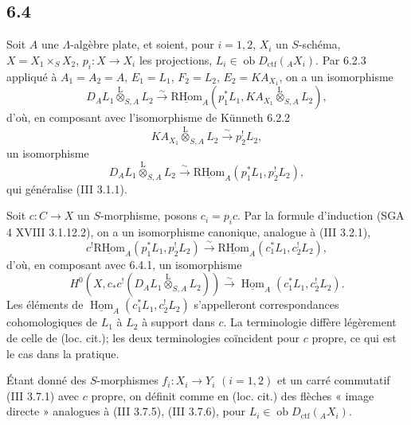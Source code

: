 \documentclass[11pt]{article}
\DeclareMathOperator{\Hom}{Hom}
\providecommand{\RHom}{\mathrm{RHom}}
\providecommand{\uRHom}{\underline{\RHom}}
\providecommand{\uHom}{\underline{\Hom}}
\providecommand{\lten}{\overset{\mathrm L}{\otimes}}
\providecommand{\Ob}{\operatorname{ob}}
\providecommand{\RHom}{\mathrm{RHom}}
\providecommand{\Hom}{\operatorname{Hom}}
\providecommand{\lten}{\overset{\mathrm L}{\otimes}}
\providecommand{\RHom}{\mathrm R\mathcal{H}om}
\providecommand{\lten}{\overset{\mathrm L}{\otimes}}
\providecommand{\Ob}{\operatorname{ob}}
\providecommand{\lten}{\overset{\mathrm L}{\otimes}}
\providecommand{\lten}{\overset{\mathrm L}{\otimes}}
\providecommand{\Ob}{\operatorname{Ob}}
\providecommand{\lten}{\overset{\mathrm L}{\otimes}}
\providecommand{\RHom}{\mathrm{RHom}}
\providecommand{\Hom}{\operatorname{Hom}}
\providecommand{\Ob}{\operatorname{ob}}
\providecommand{\Ob}{\operatorname{Ob}}
\providecommand{\lten}{\overset{\mathrm L}{\otimes}}
\begin{document}
\subsection*{6.4}
Soit $A$ une $\Lambda$-algèbre plate, et soient, pour $i=1,2$, $X_i$ un $S$-schéma, $X=X_1\times_SX_2$, $p_i:X\to X_i$ les projections, $L_i\in\Ob D_{\mathrm{ctf}}({}_AX_i)$. Par 6.2.3 appliqué à $A_1=A_2=A$, $E_1=L_1$, $F_2=L_2$, $E_2=KA_{X_1}$, on a un isomorphisme
\[
D_A L_1\lten_{S,A}L_2
\xrightarrow{\sim}
\uRHom_A(p_1^*L_1,KA_{X_1}\lten_{S,A}L_2),
\]
d'où, en composant avec l'isomorphisme de Künneth 6.2.2
\[
KA_{X_1}\lten_{S,A}L_2\xrightarrow{\sim}p_2^!L_2,
\]
un isomorphisme
\begin{equation}
D_AL_1\lten_{S,A}L_2
\xrightarrow{\sim}
\uRHom_A(p_1^*L_1,p_2^!L_2),
\tag{6.4.1}
\end{equation}
qui généralise (III 3.1.1).

Soit $c:C\to X$ un $S$-morphisme, posons $c_i=p_ic$. Par la formule d'induction (SGA 4 XVIII 3.1.12.2), on a un isomorphisme canonique, analogue à (III 3.2.1),
\begin{equation}
c^!\uRHom_A(p_1^*L_1,p_2^!L_2)
\xrightarrow{\sim}
\uRHom_A(c_1^*L_1,c_2^!L_2),
\tag{6.4.2}
\end{equation}
d'où, en composant avec 6.4.1, un isomorphisme
\begin{equation}
H^0(X,c_*c^!(D_AL_1\lten_{S,A}L_2))
\xrightarrow{\sim}
\uHom_A(c_1^*L_1,c_2^!L_2).
\tag{6.4.3}
\end{equation}
Les éléments de $\uHom_A(c_1^*L_1,c_2^!L_2)$ s'appelleront correspondances cohomologiques de $L_1$ à $L_2$ à support dans $c$. La terminologie diffère légèrement de celle de (loc. cit.); les deux terminologies coïncident pour $c$ propre, ce qui est le cas dans la pratique.

Étant donné des $S$-morphismes $f_i:X_i\to Y_i$ $(i=1,2)$ et un carré commutatif (III 3.7.1) avec $c$ propre, on définit comme en (loc. cit.) des flèches « image directe » analogues à (III 3.7.5), (III 3.7.6), pour $L_i\in\Ob D_{\mathrm{ctf}}({}_AX_i)$.
\end{document}
